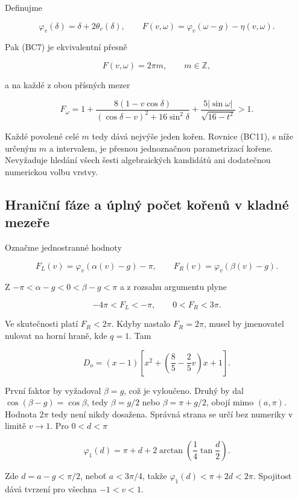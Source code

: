 \documentclass[11pt,a4paper]{article}
\theoremstyle{remark}\newtheorem{remark}[theorem]{Poznámka}
\numberwithin{equation}{section}
\begin{document}
Definujme

\[
\varphi_v(\delta)=\delta+2\theta_v(\delta),\qquad
F(v,\omega)=\varphi_v(\omega-g)-\eta(v,\omega).
\tag{BC10}
\]

Pak (BC7) je ekvivalentní přesně

\[
\boxed{F(v,\omega)=2\pi m,\qquad m\in\mathbb Z,}
\tag{BC11}
\]

a na každé z obou přísných mezer

\[
\boxed{
F_\omega
=1+\frac{8(1-v\cos\delta)}
          {(\cos\delta-v)^2+16\sin^2\delta}
 +\frac{5|\sin\omega|}{\sqrt{16-t^2}}>1.
}
\tag{BC12}
\]

Každé povolené celé \(m\) tedy dává nejvýše jeden kořen. Rovnice (BC11),
s níže určeným \(m\) a intervalem, je přesnou jednoznačnou parametrizací
kořene. Nevyžaduje hledání všech šesti algebraických kandidátů ani
dodatečnou numerickou volbu vrstvy.

\hypertarget{hraniux10dnuxed-fuxe1ze-a-uxfaplnuxfd-poux10det-koux159enux16f-v-kladnuxe9-mezeux159e}{%
\subsection{Hraniční fáze a úplný počet kořenů v kladné
mezeře}\label{hraniux10dnuxed-fuxe1ze-a-uxfaplnuxfd-poux10det-koux159enux16f-v-kladnuxe9-mezeux159e}}

Označme jednostranné hodnoty

\[
F_L(v)=\varphi_v(\alpha(v)-g)-\pi,\qquad
F_R(v)=\varphi_v(\beta(v)-g).
\tag{BC13}
\]

Z \(-\pi<\alpha-g<0<\beta-g<\pi\) a z rozsahu argumentu plyne

\[
-4\pi<F_L<-\pi,\qquad 0<F_R<3\pi.
\tag{BC14}
\]

Ve skutečnosti platí \(F_R<2\pi\). Kdyby nastalo \(F_R=2\pi\), musel by
jmenovatel nulovat na horní hraně, kde \(q=1\). Tam

\[
D_o=(x-1)\left[x^2+\left(\frac85-\frac25v\right)x+1\right].
\tag{BC15}
\]

První faktor by vyžadoval \(\beta=g\), což je vyloučeno. Druhý by dal
\(\cos(\beta-g)=\cos\beta\), tedy \(\beta=g/2\) nebo \(\beta=\pi+g/2\),
obojí mimo \((a,\pi)\). Hodnota \(2\pi\) tedy není nikdy dosažena.
Správná strana se určí bez numeriky v limitě \(v\to1\). Pro \(0<d<\pi\)

\[
\varphi_1(d)=\pi+d+2\arctan\left(\frac14\tan\frac d2\right).
\]

Zde \(d=a-g<\pi/2\), neboť \(a<3\pi/4\), takže
\(\varphi_1(d)<\pi+2d<2\pi\). Spojitost dává tvrzení pro všechna
\(-1<v<1\).
\end{document}
